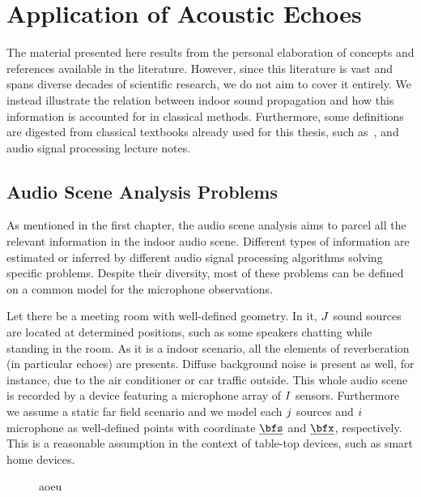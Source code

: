 \chapter{Application of Acoustic Echoes}\label{ch:application}

 \synopsisChApplication

The material presented here results from the personal elaboration of concepts and references available in the literature.
However, since this literature is vast and spans diverse decades of scientific research, we do not aim to cover it entirely. We instead illustrate the relation between indoor sound propagation and how this information is accounted for in classical methods.
Furthermore, some definitions are digested from classical textbooks already used for this thesis, such as~, and audio signal processing lecture notes.

\section{Audio Scene Analysis Problems}
As mentioned in the first chapter, the audio scene analysis aims to parcel all the relevant information in the indoor audio scene.
Different types of information are estimated or inferred by different audio signal processing algorithms solving specific problems.
Despite their diversity, most of these problems can be defined on a common model for the microphone observations.

\mynewline
Let there be a meeting room with well-defined geometry.
In it, $J$ sound sources are located at determined positions, such as some speakers chatting while standing in the room.
As it is a indoor scenario, all the elements of reverberation (in particular echoes) are presents.
Diffuse background noise is present as well, for instance, due to the air conditioner or car traffic outside.
This whole audio scene is recorded by a device featuring a microphone array of $I$ sensors.
Furthermore we assume a static far field scenario and we model each $j$ sources and $i$ microphone as well-defined points with coordinate $\positionSource$ and $\positionMicrophone$, respectively.
This is a reasonable assumption in the context of table-top devices, such as smart home devices.

\begin{figure}
    aoeu
\end{figure}

